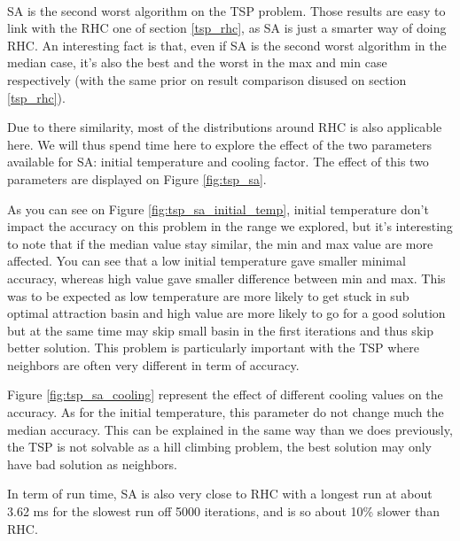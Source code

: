 \documentclass[twocolumn,a4paper,10pt]{article}
\begin{document}
\paragraph{}
SA is the second worst algorithm on the TSP problem. Those results are easy to link with the RHC one of section \ref{tsp_rhc}, as SA is just a smarter way of doing RHC. An interesting fact is that, even if SA is the second worst algorithm in the median case, it's also the best and the worst in the max and min case respectively (with the same prior on result comparison disused on section \ref{tsp_rhc}).

Due to there similarity, most of the distributions around RHC is also applicable here. We will thus spend time here to explore the effect of the two parameters available for SA: initial temperature and cooling factor. The effect of this two parameters are displayed on Figure \ref{fig:tsp_sa}.

As you can see on Figure \ref{fig:tsp_sa_initial_temp}, initial temperature don't impact the accuracy on this problem in the range we explored, but it's interesting to note that if the median value stay similar, the min and max value are more affected. You can see that a low initial temperature gave smaller minimal accuracy, whereas high value gave smaller difference between min and max. This was to be expected as low temperature are more likely to get stuck in sub optimal attraction basin and high value are more likely to go for a good solution but at the same time may skip small basin in the first iterations and thus skip better solution. This problem is particularly important with the TSP where neighbors are often very different in term of accuracy.

Figure \ref{fig:tsp_sa_cooling} represent the effect of different cooling values on the accuracy. As for the initial temperature, this parameter do not change much the median accuracy. This can be explained in the same way than we does previously, the TSP is not solvable as a hill climbing problem, the best solution may only have bad solution as neighbors.

In term of run time, SA is also very close to RHC with a longest run at about 3.62 ms for the slowest run off 5000 iterations, and is so about 10\% slower than RHC.
\end{document}
